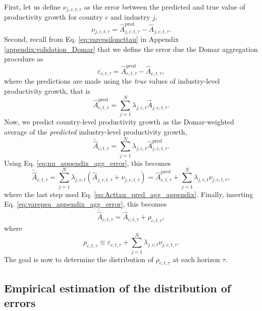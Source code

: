 First, let us define $\nu_{j,c,t,\tau}$ as the error between the predicted and  true value of productivity growth for country $c$ and industry $j$, 
\begin{equation}
\nu_{j,c,t,\tau} = \hat{A}^{\text{pred}}_{j,c,t,\tau} -\hat{A}_{j,c,t,\tau}.
\label{eq:nu_appendix_agg_error}
\end{equation}
Second, recall from Eq. \ref{eq:varepsiloncttau} in Appendix \ref{appendix:validation_Domar} that we define the error due the Domar aggregation procedure as
\begin{equation}
\varepsilon_{c,t,\tau}=  \hat{A}_{c,t,\tau}^\text{pred} - \hat{A}_{c,t,\tau},
\label{eq:varepsu_appendix_agg_error}
\end{equation}
where the predictions are made using the \textit{true} values of industry-level productivity growth, that is
\begin{equation}
\hat{A}_{c,t,\tau}^\text{pred} = \sum_{j=1}^N \lambda_{j,c,t} \hat{A}_{j,c,t,\tau}.
\label{eq:Acttau_pred_agg_appendix}
\end{equation}
Now, we predict country-level productivity growth as the Domar-weighted average of the \textit{predicted} industry-level productivity growth,
\begin{equation}
 \tilde{\hat{A}}_{c,t,\tau} = \sum_{j=1}^N \lambda_{j,c,t} \hat{A}^{\text{pred}}_{j,c,t,\tau}.
\end{equation}
Using Eq. \ref{eq:nu_appendix_agg_error}, this becomes
\begin{equation}
 \tilde{\hat{A}}_{c,t,\tau} = \sum_{j=1}^N \lambda_{j,c,t} (\hat{A}_{j,c,t,\tau} + \nu_{j,c,t,\tau}) = \hat{A}_{c,t,\tau}^\text{pred} + \sum_{j=1}^N \lambda_{j,c,t} \nu_{j,c,t,\tau},
\end{equation}
where the last step used Eq. \ref{eq:Acttau_pred_agg_appendix}. Finally, inserting  Eq. \ref{eq:varepsu_appendix_agg_error}, this becomes
\begin{equation}
 \tilde{\hat{A}}_{c,t,\tau} =  \hat{A}_{c,t,\tau} + \rho_{c,t,\tau},
\end{equation}
where
\begin{equation}
\label{eq_agg_combined_error}
\rho_{c,t,\tau} \equiv \varepsilon_{c,t,\tau} + \sum_{j=1}^N \lambda_{j,c,t} \nu_{j,c,t,\tau}.
\end{equation}
The goal is now to determine the distribution of $\rho_{c,t,\tau}$ at each horizon $\tau$.

\subsection{Empirical estimation of the distribution of errors}


